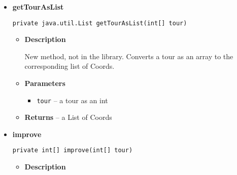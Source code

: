 \documentclass[11pt,a4paper]{report}
\begin{document}
{{{{{{{{{{{{\begin{itemize}
{\begin{itemize}
{Computes a tour by first using JGraphT's TwoOptHeuristicTSP (the superclass of this) to find a short tour using the edge weights in the provided graph, which are straight line (obstacle avoiding) distance measures. Then, it runs a second pass of 2-opt to further improve upon the tour by instead using a FlightPlanner to generate the actual drone moves along the tour and using the number of moves as the weight of a tour.
}
\item{
{\bf  Parameters}
  \begin{itemize}
   \item{
\texttt{graph} -- the input sensor graph containing the start location and the sensors, and edge weights of the shortest path between two points which avoids obstacles.}
  \end{itemize}
}%
\item{{\bf  Returns} -- 
the tour as a GraphPath 
}%
\end{itemize}
}%
\item{ 
\hypertarget{uk.ac.ed.inf.aqmaps.flightplanning.EnhancedTwoOptTSP.getTourAsList(int[])}{{\bf  getTourAsList}\\}
\begin{lstlisting}[frame=none]
private java.util.List getTourAsList(int[] tour)\end{lstlisting} %
\begin{itemize}
\item{
{\bf  Description}

New method, not in the library. Converts a tour as an array to the corresponding list of Coords.
}
\item{
{\bf  Parameters}
  \begin{itemize}
   \item{
\texttt{tour} -- a tour as an int\lbrack \rbrack }
  \end{itemize}
}%
\item{{\bf  Returns} -- 
a List of Coords 
}%
\end{itemize}
}%
\item{ 
\hypertarget{uk.ac.ed.inf.aqmaps.flightplanning.EnhancedTwoOptTSP.improve(int[])}{{\bf  improve}\\}
\begin{lstlisting}[frame=none]
private int[] improve(int[] tour)\end{lstlisting} %
\begin{itemize}
\item{
{\bf  Description}

}
\end{itemize}}
\end{itemize}}}}}}}}}}}}}
\end{document}
